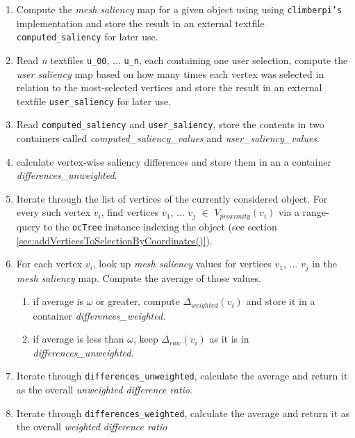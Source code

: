 \begin{enumerate}
	\item Compute the \textit{mesh saliency} map for a given object using using \texttt{climberpi's} implementation \cite{clms} and store the result in an external textfile \texttt{computed\_saliency} for later use.
	\item Read \textit{n} textfiles \texttt{u\_00}, ... \texttt{u\_n}, each containing one user selection, compute the \textit{user saliency} map based on how many times each vertex was selected in relation to the most-selected vertices and store the result in an external textfile \texttt{user\_saliency} for later use.
	\item Read \texttt{computed\_saliency} and \texttt{user\_saliency}, store the contents in two containers called \textit{computed\_saliency\_values} and \textit{user\_saliency\_values}.
	\item calculate vertex-wise saliency differences and store them in an a container \textit{differences\_unweighted}.
	\item Iterate through the list of vertices of the currently considered object. For every such vertex $v_i$, find vertices $v_1$, ... $v_j$ $\in$ $V_{proximity}(v_i)$ via a range-query to the \texttt{ocTree} instance indexing the object (see section \ref{sec:addVerticesToSelectionByCoordinates()}).
	\item For each vertex $v_i$, look up \textit{mesh saliency} values for vertices $v_1$, ... $v_j$ in the \textit{mesh saliency} map. Compute the average of those values.
	\begin{enumerate}
		\item if average is $\omega$ or greater, compute $\Delta_{weighted}(v_i)$ and store it in a container \textit{differences\_weighted}.
		\item if average is less than $\omega$, keep $\Delta_{raw}(v_i)$ as it is in \textit{differences\_unweighted}.
	\end{enumerate}
	\item Iterate through \texttt{differences\_unweighted}, calculate the average and return it as the overall \textit{unweighted difference ratio}.
	\item Iterate through \texttt{differences\_weighted}, calculate the average and return it as the overall \textit{weighted difference ratio}
\end{enumerate}

